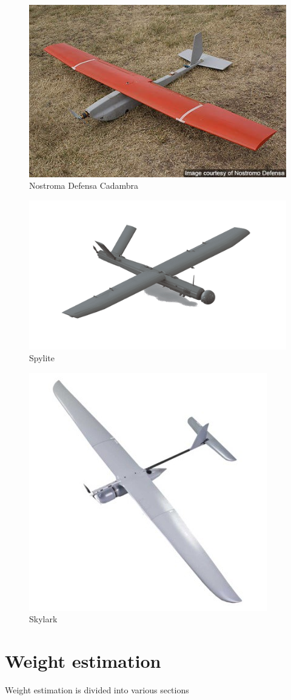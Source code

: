\documentclass[12 pt]{article}
\begin{document}
\begin{figure}[h!]
    \centering
    \includegraphics[width=0.45\linewidth]{Aircraft pics/Nostroma.jpg}
    \caption{Nostroma Defensa Cadambra}
    \label{fig:enter-label}
\end{figure}

\begin{figure}[h]
    \centering
    \includegraphics[width=0.5\linewidth]{Aircraft pics/spylite.png}
    \caption{Spylite}
    \label{fig:enter-label}
\end{figure}

\begin{figure}[h]
    \centering
    \includegraphics[width=0.3\linewidth]{Aircraft pics/Skylark.jpg}
    \caption{Skylark}
    \label{fig:enter-label}
\end{figure}

\newpage


\section{Weight estimation}

Weight estimation is divided into various sections
\end{document}
